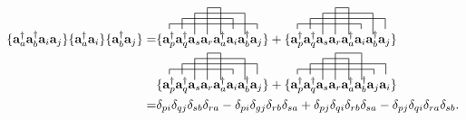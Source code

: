 \documentclass[a4paper,norsk,11pt,twoside]{report}
\begin{document}
\begin{align}
\{\textbf{a}^{\dag}_a \textbf{a}^{\dag}_b \textbf{a}_i \textbf{a}_j \}
\{\textbf{a}^{\dag}_a \textbf{a}_i \}
\{\textbf{a}^{\dag}_b \textbf{a}_j \}
 = &
\{
\contraction{}{\textbf{a}^{\dag}_p}{\textbf{a}^{\dag}_q 
\textbf{a}_s \textbf{a}_r
\textbf{a}^{\dag}_a \textbf{a}_i
\textbf{a}^{\dag}_b}{\textbf{a}_j}
\contraction[2ex]{\textbf{a}^{\dag}_p}{\textbf{a}^{\dag}_q}{\textbf{a}_s \textbf{a}_r
\textbf{a}^{\dag}_a}{\textbf{a}_i}
\contraction[4ex]{\textbf{a}^{\dag}_p \textbf{a}^{\dag}_q}{\textbf{a}_s}{\textbf{a}_r
\textbf{a}^{\dag}_a \textbf{a}_i}{\textbf{a}^{\dag}_b}
\contraction[5ex]{\textbf{a}^{\dag}_p \textbf{a}^{\dag}_q 
\textbf{a}_s}{\textbf{a}_r}{}{\textbf{a}^{\dag}_a}
\textbf{a}^{\dag}_p \textbf{a}^{\dag}_q 
\textbf{a}_s \textbf{a}_r
\textbf{a}^{\dag}_a \textbf{a}_i
\textbf{a}^{\dag}_b \textbf{a}_j 
\}
+ 
\{
\contraction[4ex]{\textbf{a}^{\dag}_p \textbf{a}^{\dag}_q}{\textbf{a}_s}{\textbf{a}_r
\textbf{a}^{\dag}_a \textbf{a}_i}{\textbf{a}^{\dag}_b}
\contraction[5ex]{\textbf{a}^{\dag}_p \textbf{a}^{\dag}_q 
\textbf{a}_s}{\textbf{a}_r}{}{\textbf{a}^{\dag}_a}
\contraction{}{\textbf{a}^{\dag}_p}{\textbf{a}^{\dag}_q 
\textbf{a}_s \textbf{a}_r
\textbf{a}^{\dag}_a}{\textbf{a}_i}
\contraction[2ex]{\textbf{a}^{\dag}_p}{\textbf{a}^{\dag}_q}{\textbf{a}_s \textbf{a}_r
\textbf{a}^{\dag}_a \textbf{a}_i
\textbf{a}^{\dag}_b}{\textbf{a}_j}
\textbf{a}^{\dag}_p \textbf{a}^{\dag}_q 
\textbf{a}_s \textbf{a}_r
\textbf{a}^{\dag}_a \textbf{a}_i
\textbf{a}^{\dag}_b \textbf{a}_j 
\} \nonumber \\ & 
\{
\contraction[4ex]{\textbf{a}^{\dag}_p \textbf{a}^{\dag}_q}{\textbf{a}_s}{\textbf{a}_r
\textbf{a}^{\dag}_a \textbf{a}_i}{\textbf{a}^{\dag}_b}
\contraction[5ex]{\textbf{a}^{\dag}_p \textbf{a}^{\dag}_q 
\textbf{a}_s}{\textbf{a}_r}{}{\textbf{a}^{\dag}_a}
\contraction{}{\textbf{a}^{\dag}_p}{\textbf{a}^{\dag}_q 
\textbf{a}_s \textbf{a}_r
\textbf{a}^{\dag}_a}{\textbf{a}_i}
\contraction[2ex]{\textbf{a}^{\dag}_p}{\textbf{a}^{\dag}_q}{\textbf{a}_s \textbf{a}_r
\textbf{a}^{\dag}_a \textbf{a}_i
\textbf{a}^{\dag}_b}{\textbf{a}_j}
\textbf{a}^{\dag}_p \textbf{a}^{\dag}_q 
\textbf{a}_s \textbf{a}_r
\textbf{a}^{\dag}_a \textbf{a}_i
\textbf{a}^{\dag}_b \textbf{a}_j 
\}
+
\{
\contraction[4ex]{\textbf{a}^{\dag}_p \textbf{a}^{\dag}_q}{\textbf{a}_s}{\textbf{a}_r}{\textbf{a}^{\dag}_a}
\contraction[5ex]{\textbf{a}^{\dag}_p \textbf{a}^{\dag}_q 
\textbf{a}_s}{\textbf{a}_r}{\textbf{a}^{\dag}_a}{\textbf{a}^{\dag}_b}
\contraction[2ex]{\textbf{a}^{\dag}_p}{\textbf{a}^{\dag}_q}{\textbf{a}_s \textbf{a}_r
\textbf{a}^{\dag}_a \textbf{a}^{\dag}_b\textbf{a}_j}{\textbf{a}_i}
\contraction{}{\textbf{a}^{\dag}_p}{\textbf{a}^{\dag}_q 
\textbf{a}_s \textbf{a}_r \textbf{a}^{\dag}_a \textbf{a}^{\dag}_b}{\textbf{a}_j}
\textbf{a}^{\dag}_p \textbf{a}^{\dag}_q 
\textbf{a}_s \textbf{a}_r
\textbf{a}^{\dag}_a \textbf{a}^{\dag}_b
\textbf{a}_j \textbf{a}_i
\} \nonumber \\
 = & \delta_{pi} \delta_{qj} \delta_{sb} \delta_{ra} 
- \delta_{pi} \delta_{gj} \delta_{rb} \delta_{sa}
+ \delta_{pj} \delta_{qi} \delta_{rb} \delta_{sa}
- \delta_{pj} \delta_{qi} \delta_{ra} \delta_{sb} .
\end{align}
\end{document}

